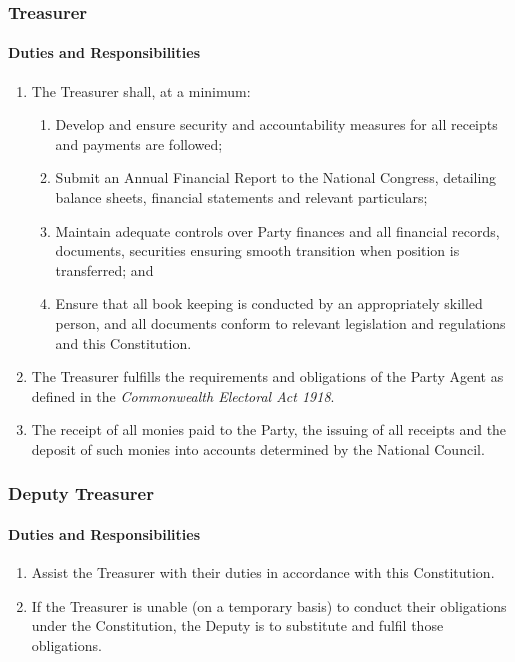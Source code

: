 \documentclass[a4paper,titlepage,8.5pt]{article}
\begin{document}
\subsubsection{Treasurer}

\paragraph{Duties and Responsibilities}

\begin{enumerate}
\item The Treasurer shall, at a minimum:
\begin{enumerate}
\item Develop and ensure security and accountability measures for all receipts and payments are followed;
\item Submit an Annual Financial Report to the National Congress, detailing balance sheets, financial statements and relevant particulars;
\item Maintain adequate controls over Party finances and all financial records, documents, securities ensuring smooth transition when position is transferred; and
\item Ensure that all book keeping is conducted by an appropriately skilled person, and all documents conform to relevant legislation and regulations and this Constitution.
\end{enumerate}
\item The Treasurer fulfills the requirements and obligations of the Party Agent as defined in the \textit{Commonwealth Electoral Act 1918}.
\item The receipt of all monies paid to the Party, the issuing of all receipts and the deposit of such monies into accounts determined by the National Council.
\end{enumerate}

\subsubsection{Deputy Treasurer}

\paragraph{Duties and Responsibilities}

\begin{enumerate}
\item Assist the Treasurer with their duties in accordance with this Constitution.
\item If the Treasurer is unable (on a temporary basis) to conduct their obligations under the Constitution, the Deputy is to substitute and fulfil those obligations.
\end{enumerate}
\end{document}
